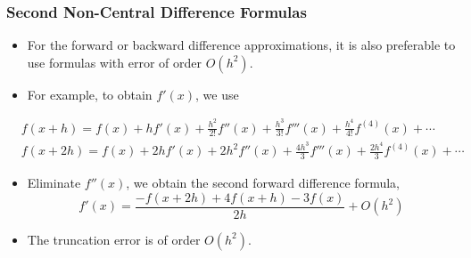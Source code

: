 \documentclass{beamer}
\begin{document}
\begin{frame}[fragile]
\frametitle{Second Non-Central Difference Formulas}
\begin{itemize}
\item For the forward or backward difference approximations, it is also preferable to use formulas with error of order $O(h^2)$.
\item For example, to obtain $f'(x)$, we use
\end{itemize}
\begin{align}
&f(x+h)=f(x)+hf'(x)+\frac{h^2}{2!} f''(x)+ \frac{h^3}{3!} f'''(x)+\frac{h^4}{4!} f^{(4)}(x)+\cdots\nonumber\\
&f(x+2h)=f(x)+2hf'(x)+2h^2 f''(x)+ \frac{4h^3}{3} f'''(x)+\frac{2h^4}{3} f^{(4)}(x)+\cdots\nonumber
\end{align}
\begin{itemize}
\item Eliminate $f''(x)$, we obtain the \alert{ second forward difference} formula,
\[
f'(x)=\frac{-f(x+2h)+4f(x+h)-3f(x)}{2h}+O(h^2)
\]
\item The truncation error is of order $O(h^2)$. 
\end{itemize}
\end{frame}
\end{document}
